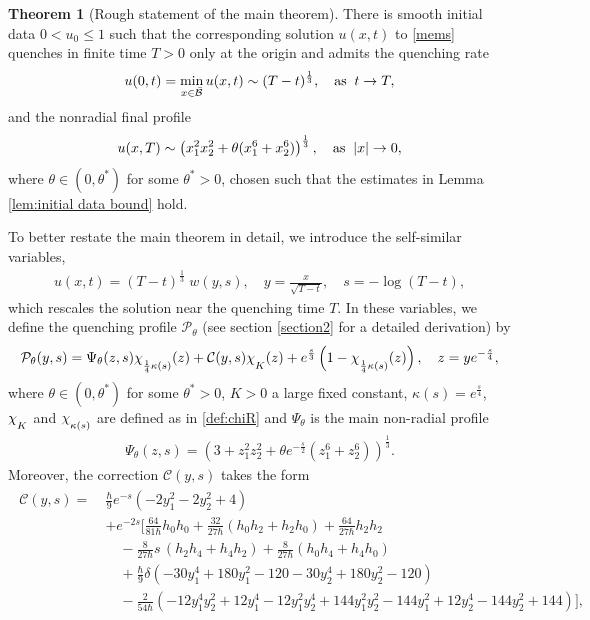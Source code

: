 \documentclass[11pt,reqno]{amsart}
\theoremstyle{definition}
\newtheorem{theorem}{Theorem}[section]
\theoremstyle{bfremark}
\numberwithin{equation}{section}
\newcommand{\mchi}{\raisebox{0pt}[1ex][1ex]{$\chi$}}
\begin{document}
\begin{theorem}[Rough statement of the main theorem] There is smooth initial data $0 < u_0 \leq 1$ such that the corresponding solution $u(x,t)$ to \eqref{mems} quenches in finite time $T > 0$ only at the origin and admits the quenching rate 
\begin{equation}
   u(0,t ) = \min_{x \in \bar{\mathcal{B}}} u(x,t) \sim (T-t)^{\frac{1}{3}}, \quad \textup{as}\;\; t \to T,
\end{equation}
and the nonradial final profile 
\begin{equation}
    u(x,T) \sim \left(x_1^2 x_2^2 + \theta(x_1^6 + x_2^6)\right)^{\frac{1}{3}},\quad \textup{as} \;\; |x| \to 0,
\end{equation}
where $\theta \in (0, \theta^*)$ for some $\theta^* > 0$, chosen such that the estimates in Lemma \ref{lem:initial data bound} hold.
\end{theorem}  
To better restate the main theorem in detail, we introduce the self-similar variables,
\begin{align}
     u(x,t) = (T-t)^{\frac{1}{3}}\; w(y,s), \quad y = \frac{x}{\sqrt{T - t}}, \quad s = -\log(T - t),\label{selfsimvari}
\end{align}
which rescales the solution near the quenching time \(T\). In these variables, we define the quenching profile \(\mathcal{P}_{\theta}\) (see section \ref{section2} for a detailed derivation) by
\begin{align}
        \mathcal{P}_{\theta}(y,s) = \Psi_{\theta}(z,s)\mchi_{\frac{1}{4}\kappa(s)}(z) + \mathcal{C}(y,s) \mchi_K(z)+e^{\frac{s}{3}}\left(1-\mchi_{\frac{1}{4}\kappa(s)}(z)\right), \quad z=ye^{-\frac{s}{4}},\label{qp}
\end{align}
where \(\theta \in (0, \theta^*)\) for some $\theta^* > 0$, $K > 0$ a large fixed constant, \(\kappa(s)=e^{\frac{s}{4}}\), \(\mchi_K\) and \(\mchi_{\kappa(s)}\) are defined as in \ref{def:chiR} and $\Psi_{\theta}$ is the main non-radial profile 
\begin{align*}
        \Psi_{\theta}(z,s) = \left(3 + z_1^2 z_2^2 + \theta e^{-\frac{s}{2}}(z_1^6 + z_2^6)\right)^{\frac{1}{3}}.
\end{align*}
Moreover, the correction $\mathcal{C}(y,s)$ takes the form
\begin{align}
\begin{split}
    \mathcal{C}(y,s) =\ & \frac{\hbar}{9} e^{-s} (-2 y_1^2 - 2 y_2^2 + 4) \\
    & + e^{-2s} \Bigg[ 
        \frac{64}{81\hbar} h_0 h_0 
        + \frac{32}{27\hbar} (h_0 h_2 + h_2 h_0) 
        + \frac{64}{27\hbar} h_2 h_2 \\
    & \quad  -\frac{8}{27\hbar}s\, (h_2 h_4 + h_4 h_2) 
        + \frac{8}{27\hbar} (h_0 h_4 + h_4 h_0) \\
    & \quad + \frac{\hbar}{9} \delta (-30 y_1^4 + 180 y_1^2 - 120 - 30 y_2^4 + 180 y_2^2 - 120) \\
    & \quad - \frac{2}{54\hbar} \left( -12 y_1^4 y_2^2 + 12 y_1^4 - 12 y_1^2 y_2^4 + 144 y_1^2 y_2^2 
        - 144 y_1^2 + 12 y_2^4 - 144 y_2^2 + 144 \right)
    \Bigg],\label{corr}
\end{split}
\end{align}
\end{document}
